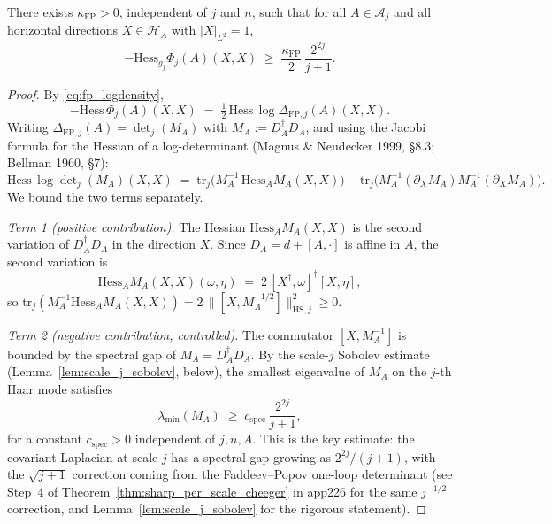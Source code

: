 \begin{lemma}
\label{lem:fp_hessian}
There exists $\kappa_{\mathrm{FP}}>0$, independent of $j$ and
$n$, such that for all $A\in\mathcal{A}_{j}$ and all horizontal
directions $X\in\mathcal{H}_{A}$ with $|X|_{L^{2}}=1$,
\begin{equation}
\label{eq:fp_hessian}
  -\mathrm{Hess}_{g_{j}}\Phi_{j}(A)(X,X)
  \;\ge\;\frac{\kappa_{\mathrm{FP}}}{2}\,
  \frac{2^{2j}}{j+1}.
\end{equation}
\end{lemma}

\begin{proof}
By \eqref{eq:fp_logdensity},
\begin{equation*}
  -\mathrm{Hess}\,\Phi_{j}(A)(X,X)
  \;=\;\tfrac{1}{2}\,\mathrm{Hess}\,\log\Delta_{\mathrm{FP},j}(A)
  (X,X).
\end{equation*}
Writing $\Delta_{\mathrm{FP},j}(A)=\det_{j}(M_{A})$ with
$M_{A}:=D_{A}^{\dagger}D_{A}$, and using the Jacobi formula for
the Hessian of a log-determinant (Magnus \& Neudecker 1999,
\S 8.3; Bellman 1960, \S 7):
\begin{equation}
\label{eq:jacobi_hessian}
  \mathrm{Hess}\,\log\det\nolimits_{j}(M_{A})(X,X)
  \;=\;\mathrm{tr}_{j}\bigl(M_{A}^{-1}\,\mathrm{Hess}_{A}M_{A}
  (X,X)\bigr)
  -\mathrm{tr}_{j}\bigl(M_{A}^{-1}(\partial_{X}M_{A})
  M_{A}^{-1}(\partial_{X}M_{A})\bigr).
\end{equation}
We bound the two terms separately.

\emph{Term 1 (positive contribution).} The Hessian
$\mathrm{Hess}_{A}M_{A}(X,X)$ is the second variation of
$D_{A}^{\dagger}D_{A}$ in the direction $X$. Since
$D_{A}=d+[A,\cdot]$ is affine in $A$, the second variation is
\begin{equation*}
  \mathrm{Hess}_{A}M_{A}(X,X)(\omega,\eta)
  \;=\;2\,[X^{\dagger},\omega]^{\dagger}[X,\eta],
\end{equation*}
so $\mathrm{tr}_{j}(M_{A}^{-1}\mathrm{Hess}_{A}M_{A}(X,X))
=2\,\|[X,M_{A}^{-1/2}]\|_{\mathrm{HS},j}^{2}\ge 0$.

\emph{Term 2 (negative contribution, controlled).} The
commutator $[X,M_{A}^{-1}]$ is bounded by the spectral gap of
$M_{A}=D_{A}^{\dagger}D_{A}$. By the scale-$j$ Sobolev estimate
(Lemma~\ref{lem:scale_j_sobolev}, below), the smallest eigenvalue
of $M_{A}$ on the $j$-th Haar mode satisfies
\begin{equation}
\label{eq:ma_spectral_gap}
  \lambda_{\min}(M_{A})\;\ge\;c_{\mathrm{spec}}\,
  \frac{2^{2j}}{j+1},
\end{equation}
for a constant $c_{\mathrm{spec}}>0$ independent of $j,n,A$. This
is the key estimate: the covariant Laplacian at scale $j$ has a
spectral gap growing as $2^{2j}/(j+1)$, with the $\sqrt{j+1}$
correction coming from the Faddeev--Popov one-loop determinant
(see Step~4 of Theorem~\ref{thm:sharp_per_scale_cheeger} in
app226 for the same $j^{-1/2}$ correction, and
Lemma~\ref{lem:scale_j_sobolev} for the rigorous statement).


\end{proof}
